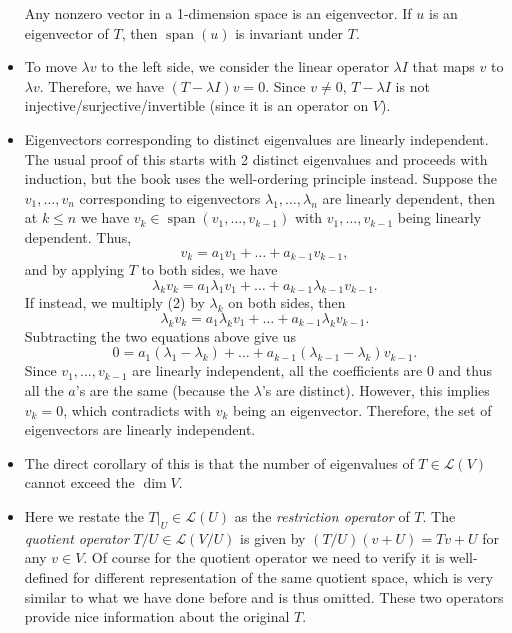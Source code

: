 \documentclass{article}
\newcommand{\s}{\operatorname{span}}
\renewcommand{\d}{\dim}
\newcommand{\LV}{\mathcal{L}(V)}
\newcommand{\bv}{v_1,\dots,v_n}
\begin{document}
\begin{itemize}
    Any nonzero vector in a 1-dimension space is an eigenvector. If $u$ is an eigenvector of $T$, then $\s(u)$ is invariant under $T$.
    \item To move $\lambda v$ to the left side, we consider the linear operator $\lambda I$ that maps $v$ to $\lambda v$. Therefore, we have $(T-\lambda I) v = 0$. Since $v \not= 0$, $T-\lambda I$ is not injective/surjective/invertible (since it is an operator on $V$).
    \item Eigenvectors corresponding to distinct eigenvalues are linearly independent. The usual proof of this starts with 2 distinct eigenvalues and proceeds with induction, but the book uses the well-ordering principle instead. Suppose the $\bv$ corresponding to eigenvectors $\lambda_1,\dots,\lambda_n$ are linearly dependent, then at $k \leq n$ we have $v_k \in \s(v_1,\dots,v_{k-1})$ with $v_1,\dots,v_{k-1}$ being linearly dependent. Thus, 
    \begin{equation}
        v_k = a_1 v_1 + \dots + a_{k-1}v_{k-1},
    \end{equation}
    and by applying $T$ to both sides, we have $$\lambda_k v_k = a_1 \lambda_1 v_1 + \dots + a_{k-1} \lambda_{k-1}v_{k-1}.$$ If instead, we multiply (2) by $\lambda_k$ on both sides, then $$\lambda_k v_k = a_1 \lambda_k v_1 + \dots + a_{k-1} \lambda_k v_{k-1}.$$ Subtracting the two equations above give us $$0 = a_1 (\lambda_1 - \lambda_k) + \dots + a_{k-1} (\lambda_{k-1}-\lambda_k) v_{k-1}.$$ Since $v_1, \dots, v_{k-1}$ are linearly independent, all the coefficients are 0 and thus all the $a$'s are the same (because the $\lambda$'s are distinct). However, this implies $v_k = 0$, which contradicts with $v_k$ being an eigenvector. Therefore, the set of eigenvectors are linearly independent.
    \item The direct corollary of this is that the number of eigenvalues of $T \in \LV$ cannot exceed the $\d V$.
    \item Here we restate the $T|_U \in \mathcal{L}(U)$ as the \textit{restriction operator} of $T$. The \textit{quotient operator} $T/U \in \mathcal{L}(V/U)$ is given by $(T/U)(v+U) = Tv+U$ for any $v \in V$. Of course for the quotient operator we need to verify it is well-defined for different representation of the same quotient space, which is very similar to what we have done before and is thus omitted. These two operators provide nice information about the original $T$.
\end{itemize}
\end{document}
